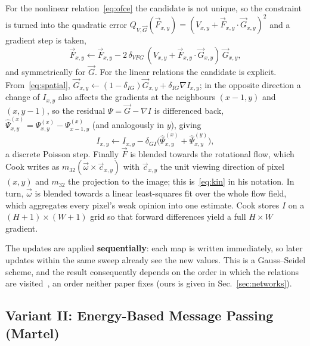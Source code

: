 \documentclass[journal]{IEEEtran}
\newcommand{\Imap}{I}
\newcommand{\Vmap}{V}
\newcommand{\Gmap}{\vec{G}}
\newcommand{\Fmap}{\vec{F}}
\newcommand{\wvec}{\vec{\omega}}
\begin{document}
For the nonlinear relation~\eqref{eq:ofce} the candidate is not unique, so the
constraint is turned into the quadratic error
$Q_{\Vmap,\Gmap}(\Fmap_{x,y}) = (\Vmap_{x,y}+\Fmap_{x,y}\cdot\Gmap_{x,y})^2$ and
a gradient step is taken,
\begin{equation}
\Fmap_{x,y} \leftarrow \Fmap_{x,y}
 - 2\,\delta_{V\!F\!G}\,
   (\Vmap_{x,y}+\Fmap_{x,y}\cdot\Gmap_{x,y})\,\Gmap_{x,y},
\label{eq:cook_ofce}
\end{equation}
and symmetrically for $\Gmap$. For the linear relations the candidate is
explicit. From~\eqref{eq:spatial},
$\Gmap_{x,y}\leftarrow(1-\delta_{I\!G})\Gmap_{x,y}+\delta_{I\!G}\nabla
\Imap_{x,y}$; in the opposite direction a change of $\Imap_{x,y}$ also affects
the gradients at the neighbours $(x\!-\!1,y)$ and $(x,y\!-\!1)$, so the residual
$\Psi=\Gmap-\nabla\Imap$ is differenced back,
$\hat\Psi^{(x)}_{x,y}=\Psi^{(x)}_{x,y}-\Psi^{(x)}_{x-1,y}$ (and analogously in
$y$), giving
\begin{equation}
\Imap_{x,y} \leftarrow \Imap_{x,y}
  - \delta_{G\!I}\big(\hat\Psi^{(x)}_{x,y}+\hat\Psi^{(y)}_{x,y}\big),
\label{eq:cook_poisson}
\end{equation}
a discrete Poisson step. Finally $\Fmap$ is blended towards the rotational flow,
which Cook writes as $m_{32}(\wvec\times\vec c_{x,y})$ with $\vec c_{x,y}$ the
unit viewing direction of pixel $(x,y)$ and $m_{32}$ the projection to the
image; this is~\eqref{eq:kin} in his notation. In turn, $\wvec$ is
blended towards a linear least-squares fit over the whole flow field,
which aggregates every pixel's weak opinion into one estimate. Cook stores
$\Imap$ on a $(H\!+\!1)\times(W\!+\!1)$ grid so that forward differences yield a
full $H\times W$ gradient.

The updates are applied \textbf{sequentially}: each map is written immediately,
so later updates within the same sweep already see the new values. This is a
Gauss--Seidel scheme, and the result consequently depends on the order in which the relations are visited~\cite{martel2015relational}, an order neither paper
fixes (ours is given in
Sec.~\ref{sec:networks}).

\subsection{Variant II: Energy-Based Message Passing (Martel)}
\label{sec:martel}
\end{document}
